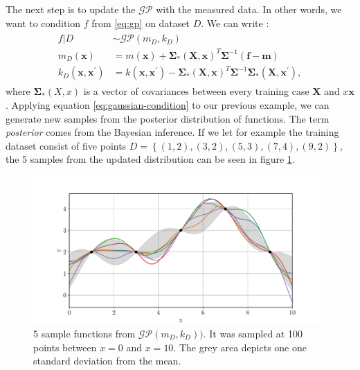 The next step is to update the $\mathcal{GP}$ with the measured data. In other words, we want to condition $f$ from \ref{eq:gp} on dataset $D$. We can write \cite{rasmussen2004}:
\begin{align}
\begin{split}
	\label{eq:gaussian-condition}
	f \vert D & \sim\mathcal{GP}(m_D,k_D) \\
	m_D(\bm{x}) & = m(\bm{x}) + \bm{\Sigma_*(X,x)}^T \bm{\Sigma}^{-1} (\bm{f}-\bm{m}) \\
	k_D(\bm{x},\bm{x}^\prime) & = k(\bm{x},\bm{x}^\prime) - \bm{\Sigma_*(X,x)}^T \bm{\Sigma}^{-1} \bm{\Sigma_*(X,x^\prime)},
\end{split}
\end{align}
where $\bm{\Sigma_*}(X,x)$ is a vector of covariances between every training case $\bm{X}$ and $x\bm{x}$ \cite{rasmussen2004}. Applying equation \ref{eq:gaussian-condition} to our previous example, we can generate new samples from the posterior distribution of functions. The term \textit{posterior} comes from the Bayesian inference. If we let for example the training dataset consist of five points $D = \left\{(1,2),(3,2),(5,3),(7,4),(9,2)\right\}$, the 5 samples from the updated distribution can be seen in figure \ref{fig:gaussian-samples-posterior}.
\begin{figure}[htb]
	\centering
	\includegraphics[width=0.98\textwidth]{figures/gaussian-samples-post}
	\caption{5 sample functions from $\mathcal{GP}(m_D,k_D))$. It was sampled at 100 points between $x = 0$ and $x=10$. The grey area depicts one one standard deviation from the mean.}
	\label{fig:gaussian-samples-posterior}
\end{figure}

